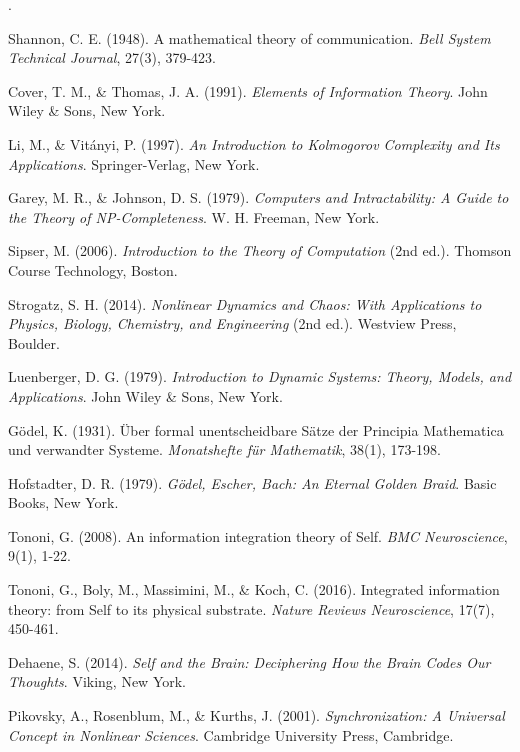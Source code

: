 \documentclass[12pt,a4paper]{article}
\begin{document}
.


\begin{thebibliography}{99}

 Shannon, C. E. (1948). A mathematical theory of communication. \textit{Bell System Technical Journal}, 27(3), 379-423.

 Cover, T. M., \& Thomas, J. A. (1991). \textit{Elements of Information Theory}. John Wiley \& Sons, New York.

 Li, M., \& Vitányi, P. (1997). \textit{An Introduction to Kolmogorov Complexity and Its Applications}. Springer-Verlag, New York.

 Garey, M. R., \& Johnson, D. S. (1979). \textit{Computers and Intractability: A Guide to the Theory of NP-Completeness}. W. H. Freeman, New York.

 Sipser, M. (2006). \textit{Introduction to the Theory of Computation} (2nd ed.). Thomson Course Technology, Boston.

 Strogatz, S. H. (2014). \textit{Nonlinear Dynamics and Chaos: With Applications to Physics, Biology, Chemistry, and Engineering} (2nd ed.). Westview Press, Boulder.

 Luenberger, D. G. (1979). \textit{Introduction to Dynamic Systems: Theory, Models, and Applications}. John Wiley \& Sons, New York.

 Gödel, K. (1931). Über formal unentscheidbare Sätze der Principia Mathematica und verwandter Systeme. \textit{Monatshefte für Mathematik}, 38(1), 173-198.

 Hofstadter, D. R. (1979). \textit{Gödel, Escher, Bach: An Eternal Golden Braid}. Basic Books, New York.

 Tononi, G. (2008). An information integration theory of Self. \textit{BMC Neuroscience}, 9(1), 1-22.

 Tononi, G., Boly, M., Massimini, M., \& Koch, C. (2016). Integrated information theory: from Self to its physical substrate. \textit{Nature Reviews Neuroscience}, 17(7), 450-461.

 Dehaene, S. (2014). \textit{Self and the Brain: Deciphering How the Brain Codes Our Thoughts}. Viking, New York.

 Pikovsky, A., Rosenblum, M., \& Kurths, J. (2001). \textit{Synchronization: A Universal Concept in Nonlinear Sciences}. Cambridge University Press, Cambridge.


\end{thebibliography}
\end{document}
